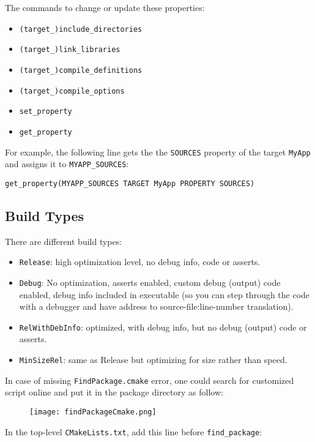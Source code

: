 The commands to change or update these properties:

\begin{itemize}
	\setlength\itemsep{0em}
	\item \verb|(target_)include_directories|
	\item \verb|(target_)link_libraries|
	\item \verb|(target_)compile_definitions|
	\item \verb|(target_)compile_options|
	\item \verb|set_property|
	\item \verb|get_property|
\end{itemize}

For example, the following line gets the the \verb|SOURCES| property of the target \texttt{MyApp} and assigns it to \verb|MYAPP_SOURCES|:

\verb|get_property(MYAPP_SOURCES TARGET MyApp PROPERTY SOURCES)|

\subsection{Build Types}

There are different build types:
\begin{itemize}
	\setlength\itemsep{0em}
	\item \verb|Release|: high optimization level, no debug info, code or asserts.
	\item \verb|Debug|: No optimization, asserts enabled, custom debug (output) code enabled, debug info included in executable (so you can step through the code with a debugger and have address to source-file:line-number translation).
	\item \verb|RelWithDebInfo|: optimized, with debug info, but no debug (output) code or asserts.
	\item \verb|MinSizeRel|: same as Release but optimizing for size rather than speed.
\end{itemize}

In case of missing \verb|FindPackage.cmake| error, one could search for customized script online and put it in the package directory as follow:

\begin{figure}[hbt!]
	\centering
	\texttt{[image: findPackageCmake.png]}
\end{figure}

In the top-level \verb|CMakeLists.txt|, add this line before \verb|find_package|:\\

